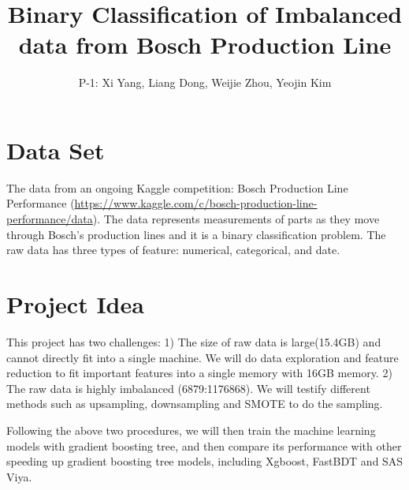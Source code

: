 \documentclass{article}
\title{Binary Classification of Imbalanced data from Bosch Production Line}
\author{
    P-1:  Xi Yang, Liang Dong, Weijie Zhou, Yeojin Kim
}
\begin{document}

\maketitle

\section{Data Set}

The data from an ongoing Kaggle competition: Bosch Production Line Performance (\url{https://www.kaggle.com/c/bosch-production-line-performance/data}). The data represents measurements of parts as they move through Bosch's production lines and it is a binary classification problem. The raw data has three types of feature: numerical, categorical, and date.

\section{Project Idea}

This project has two challenges: 1) The size of raw data is large(15.4GB) and cannot directly fit into a single machine. We will do data exploration and feature reduction to fit important features into a single memory with 16GB memory. 2) The raw data is highly imbalanced (6879:1176868). We will testify different methods such as upsampling, downsampling and SMOTE to do the sampling.

Following the above two procedures, we will then train the machine learning models with gradient boosting tree, and then compare its performance with other speeding up gradient boosting tree models, including Xgboost, FastBDT and SAS Viya. 


\end{document}
